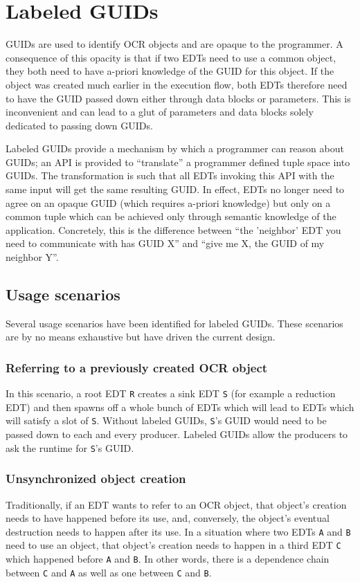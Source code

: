 \section{Labeled GUIDs}
GUIDs are used to identify OCR objects and are opaque to the
programmer. A consequence of this opacity is that if two EDTs need to
use a common object, they both need to have a-priori knowledge of the
GUID for this object. If the object was created much earlier in the
execution flow, both EDTs therefore need to have the GUID passed down
either through data blocks or parameters. This is inconvenient and can
lead to a glut of parameters and data blocks solely dedicated to
passing down GUIDs.

Labeled GUIDs provide a mechanism by which a programmer can
reason about GUIDs; an API is provided to ``translate'' a programmer
defined tuple space into GUIDs. The transformation is such that all
EDTs invoking this API with the same input will get the same resulting
GUID. In effect, EDTs no longer need to agree on an opaque GUID (which
requires a-priori knowledge) but only on a common tuple which can be
achieved only through semantic knowledge of the
application. Concretely, this is the difference between ``the
'neighbor' EDT you need to communicate with has GUID X'' and
``give me X, the GUID of my neighbor Y''.
\subsection{Usage scenarios}
Several usage scenarios have been identified for labeled GUIDs. These
scenarios are by no means exhaustive but have driven the current
design.
\subsubsection{Referring to a previously created OCR object}
In this scenario, a root EDT \texttt{R} creates a sink EDT \texttt{S}
(for example a reduction EDT) and then spawns off a whole bunch of
EDTs which will lead to EDTs which will satisfy a slot of
\texttt{S}. Without labeled GUIDs, \texttt{S}'s GUID would need to be
passed down to each and every producer. Labeled GUIDs allow the
producers to ask the runtime for \texttt{S}'s GUID.
\subsubsection{Unsynchronized object creation}
Traditionally, if an EDT wants to refer to an OCR object, that
object's creation needs to have happened before its use, and,
conversely, the object's eventual destruction needs to happen after
its use. In a situation where two EDTs \texttt{A} and \texttt{B}
need to use an object, that object's creation needs to happen in a
third EDT \texttt{C} which happened before \texttt{A} and
\texttt{B}. In other words, there is a dependence chain between
\texttt{C} and \texttt{A} as well as one between \texttt{C} and
\texttt{B}.

